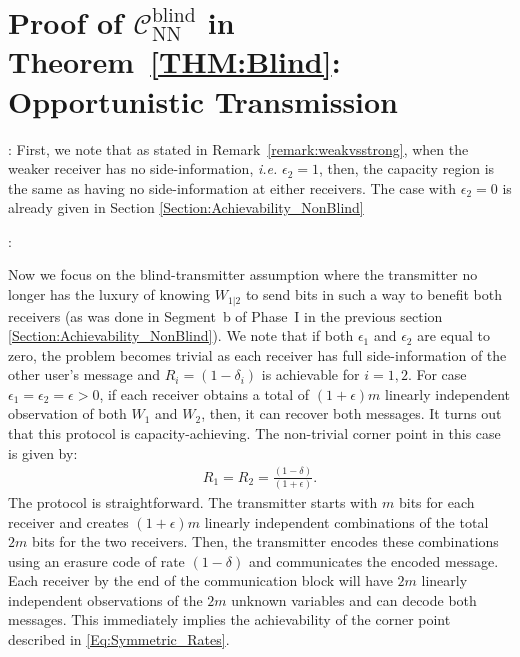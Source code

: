 \documentclass[journal,12pt,draftcls,onecolumn]{IEEEtran}
\begin{document}
\section{Proof of $\mathcal{C}^\mathrm{blind}_\mathrm{NN}$ in Theorem~\ref{THM:Blind}: Opportunistic Transmission}
\label{Section:Achievability_Blind}


: First, we note that as stated in Remark~\ref{remark:weakvsstrong},  when the weaker receiver has no side-information, \emph{i.e.} $\epsilon_2 = 1$, then, the capacity region is the same as having no side-information at either receivers. The case with $\epsilon_2 = 0$ is already given in Section \ref{Section:Achievability_NonBlind}



:


Now we focus on the blind-transmitter assumption where the transmitter no longer has the luxury of knowing $W_{1|2}$ to send bits in such a way to benefit both receivers (as was done in Segment~b of Phase~I in the previous section \ref{Section:Achievability_NonBlind}). We note that if both $\epsilon_1$ and $\epsilon_2$ are equal to zero, the problem becomes trivial as each receiver has full side-information of the other user's message and $R_i = (1 - \delta_i)$ is achievable for $i = 1,2$.  For case $\epsilon_1 = \epsilon_2 = \epsilon >0$, if each receiver obtains a total of $(1+\epsilon)m$ linearly independent observation of both $W_1$ and $W_2$, then, it can recover both messages. It turns out that this protocol is capacity-achieving. The non-trivial corner point in this case is given by:
\begin{align}
\label{Eq:Symmetric_Rates}
R_1 = R_2 = \frac{(1-\delta)}{(1+\epsilon)}.
\end{align}
The protocol is straightforward. The transmitter starts with $m$ bits for each receiver and creates $(1+\epsilon)m$ linearly independent combinations of the total $2m$ bits for the two receivers. Then, the transmitter encodes these combinations using an erasure code of rate $(1-\delta)$ and communicates the encoded message. Each receiver by the end of the communication block will have $2m$ linearly independent observations of the $2m$ unknown variables and can decode both messages. This immediately implies the achievability of the corner point described in \eqref{Eq:Symmetric_Rates}.
\end{document}
